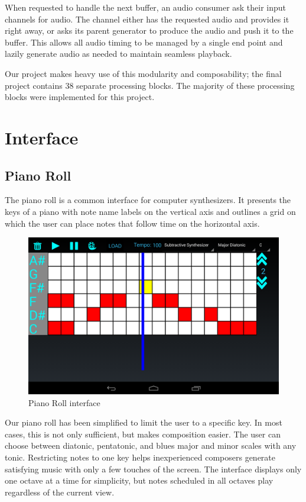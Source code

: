 \documentclass[letterpaper,12pt]{article}
\begin{document}
When requested to handle the next buffer, an audio consumer ask their input channels for audio. The channel either has the requested audio and provides it right away, or asks its parent generator to produce the audio and push it to the buffer. This allows all audio timing to be managed by a single end point and lazily generate audio as needed to maintain seamless playback.

Our project makes heavy use of this modularity and composability; the final project contains 38 separate processing blocks. The majority of these processing blocks were implemented for this project.

\section{Interface}
\label{sec:interface}

\subsection{Piano Roll}
The piano roll is a common interface for computer synthesizers. It  presents the keys of a piano with note name labels on the vertical axis and outlines a grid on which the user can place notes that follow time on the horizontal axis. 

\begin{figure}[h]
\centering
\includegraphics[width=.8\textwidth]{figures/pianoroll.png}
\caption{Piano Roll interface}
\label{fig:pianoroll}
\end{figure}

Our piano roll has been simplified to limit the user to a specific key. In most cases, this is not only sufficient, but makes composition easier. The user can choose between diatonic, pentatonic, and blues major and minor scales with any tonic. Restricting notes to one key helps inexperienced composers generate satisfying music with only a few touches of the screen. The interface displays only one octave at a time for simplicity, but notes scheduled in all octaves play regardless of the current view.
\end{document}
